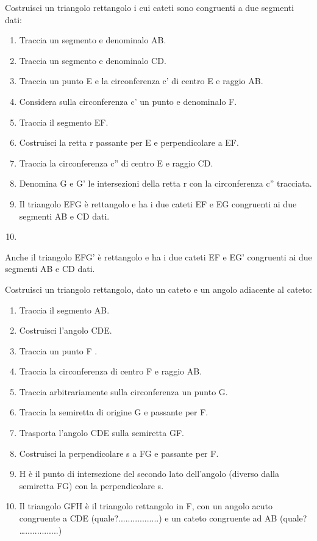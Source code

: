 \begin{procedura}
  Costruisci un triangolo rettangolo i cui cateti sono congruenti a due 
segmenti dati:
  \begin{enumerate} [nosep]
    \item 
    Traccia un segmento e denominalo AB.
    \item 
    Traccia un segmento e denominalo CD.
    \item 
    Traccia un punto E e la circonferenza c' di centro E e raggio AB.
    \item 
    Considera sulla circonferenza c' un punto e denominalo F.
    \item 
    Traccia il segmento EF.
    \item 
    Costruisci la retta r passante per E e perpendicolare a EF.
    \item 
    Traccia la circonferenza c'' di centro E e raggio CD.
    \item 
    Denomina G e G' le intersezioni della retta r con la circonferenza c'' 
tracciata.
    \item 
    Il triangolo EFG è rettangolo e ha i due cateti EF e EG congruenti ai due 
segmenti AB e CD dati. 
    \item 
  \end{enumerate}
  Anche il triangolo EFG' è rettangolo e ha i due cateti EF e EG' congruenti ai 
due segmenti AB e CD dati. \end{procedura}

\begin{procedura}
  Costruisci un triangolo rettangolo, dato un cateto e un angolo adiacente al 
cateto:
  \begin{enumerate} [nosep]
    \item 
    Traccia il segmento AB.
    \item 
    Costruisci l'angolo CDE.
    \item 
    Traccia un punto F .
    \item 
    Traccia la circonferenza di centro F e raggio AB.
    \item 
    Traccia arbitrariamente sulla circonferenza un punto G.
    \item 
    Traccia la semiretta di origine G e passante per F.
    \item 
    Trasporta l'angolo CDE sulla semiretta GF.
    \item 
    Costruisci la perpendicolare s a FG e passante per F.
    \item 
    H è il punto di intersezione del secondo lato dell'angolo (diverso dalla 
semiretta FG) con la perpendicolare s.
    \item 
    Il triangolo GFH è il triangolo rettangolo in F, con un angolo acuto 
congruente a CDE (quale?.................) e un cateto congruente ad AB (quale? 
…..............)
  \end{enumerate}
\end{procedura}

